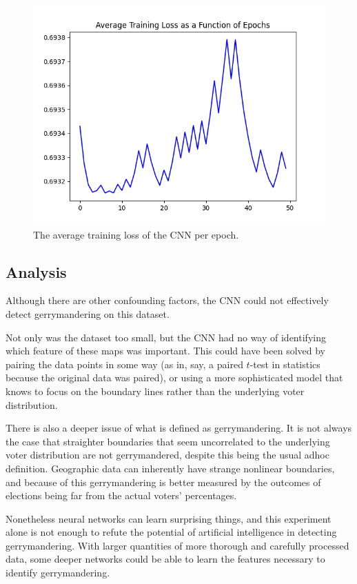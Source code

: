 \documentclass[a4paper]{article}
\theoremstyle{definition}
\begin{document}
	\begin{figure}[h]
		\centering
		\includegraphics[scale=.4]{loss.png}
		\caption{The average training loss of the CNN per epoch.}\label{fig4}
	\end{figure}

	\subsection{Analysis}
	Although there are other confounding factors, the CNN could not effectively detect gerrymandering on this dataset.
	
	Not only was the dataset too small, but the CNN had no way of identifying which feature of these maps was important. This could have been solved by pairing the data points in some way (as in, say, a paired $ t $-test in statistics because the original data was paired), or using a more sophisticated model that knows to focus on the boundary lines rather than the underlying voter distribution.
	
	There is also a deeper issue of what is defined as gerrymandering. It is not always the case that straighter boundaries that seem uncorrelated to the underlying voter distribution are not gerrymandered, despite this being the usual adhoc definition. Geographic data can inherently have strange nonlinear boundaries, and because of this gerrymandering is better measured by the outcomes of elections being far from the actual voters' percentages.
	
	Nonetheless neural networks can learn surprising things, and this experiment alone is not enough to refute the potential of artificial intelligence in detecting gerrymandering. With larger quantities of more thorough and carefully processed data, some deeper networks could be able to learn the features necessary to identify gerrymandering.

	
		
	
\end{document}
